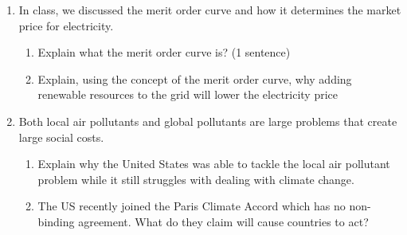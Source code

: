 \documentclass[11pt]{article}
\newcommand{\answer}[1]{\iftoggle{INCLUDEANSWERS}{{\color{violet!70!white}\textbf{Solution:} #1}}{} }
\newcommand{\points}[1]{\iftoggle{INCLUDEPOINTS}{{\color{blue!70!white}(#1 pts.)}}{}}
\begin{document}
\begin{enumerate}
  \item \points{12} In class, we discussed the merit order curve and how it determines the market price for electricity.
  \begin{enumerate}
    \item Explain what the merit order curve is? (1 sentence)
    \item Explain, using the concept of the merit order curve, why adding renewable resources to the grid will lower the electricity price
  \end{enumerate}

  \answer{
    \begin{enumerate}
      \item Merit order curve is a marginal-cost curve / supply curve for electricity generation. The cheapest resources are dispatched first and are to the left of the curve

      \item Adding renewable shifts the merit-order curve out (increases supply) and lowers the cost of electricity for consumers. 
    \end{enumerate}
  }

  \item \points{12} Both local air pollutants and global pollutants are large problems that create large social costs.
  \begin{enumerate}
    \item Explain why the United States was able to tackle the local air pollutant problem while it still struggles with dealing with climate change.
    \item The US recently joined the Paris Climate Accord which has no non-binding agreement. What do they claim will cause countries to act?
  \end{enumerate}
  
  \answer{
    \begin{enumerate}
      \item Local pollution does not have external benefits (no positive externalities), so there is no prisoner's dilemma. Whereas global pollution has a lot of externalities, so no one country has incentive to act

      \item The Paris climate accord is based on the idea of ``name and shame'' and that countries will ``do the right thing'' because they are trying to uphold their public stature. For example, war and trade are also valuable and countries need to reserve their public stature to help with trade deals and anti-war negotiations
    \end{enumerate}
  }


\end{enumerate}
\end{document}
